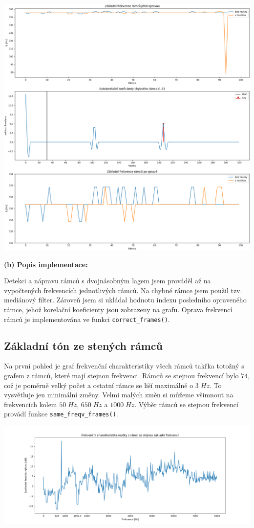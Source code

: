 \documentclass[12pt]{article}
\begin{document}
\includegraphics[scale=0.44]{ukol12.png}

\textbf{(b) Popis implementace:}

\hspace{1.5em}Detekci a nápravu rámců s dvojnásobným lagem jsem prováděl až na vypočtených frekvencích jednotlivých rámců. Na chybné rámce jsem použil tzv. mediánový filter. Zároveň jsem si ukládal hodnotu indexu posledního opraveného rámce, jehož korelační koeficienty jsou zobrazeny na grafu. Oprava frekvencí rámců je implementována ve funkci \texttt{correct\_frames()}.

\subsection{Základní tón ze stených rámců}
\hspace{1.5em}Na první pohled je graf frekvenční charakteristiky všech rámců takřka totožný s grafem z rámců, které mají stejnou frekvenci. Rámců se stejnou frekvencí bylo $74$, což je poměrně velký počet a ostatní rámce se liší maximálně o $3\; Hz$. To vysvětluje jen minimální změny. Velmi malých změn si můžeme všimnout na frekvencích kolem $50\;Hz$, $650\;Hz$ a $1000\;Hz$. Výběr rámců se stejnou frekvencí provádí funkce \texttt{same\_freqv\_frames()}.

\vspace{1em}
\hspace{-4.5em}\includegraphics[scale=0.55]{ukol13.png}
\end{document}
